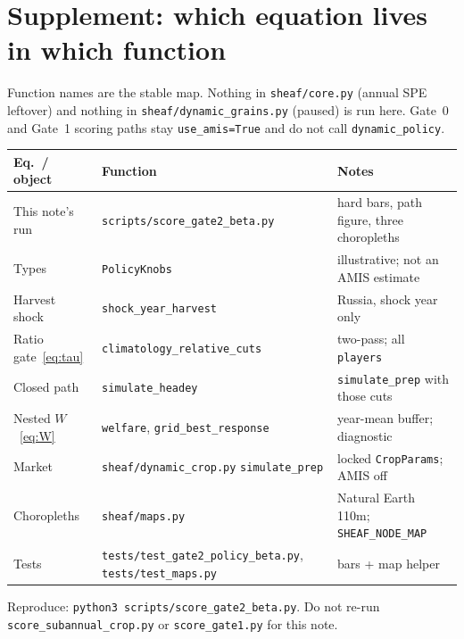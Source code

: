 \section{Supplement: which equation lives in which function}
\label{sec:code}

Function names are the stable map. Nothing in \texttt{sheaf/core.py}
(annual SPE leftover) and nothing in \texttt{sheaf/dynamic\_grains.py}
(paused) is run here. Gate~0 and Gate~1 scoring paths stay
\texttt{use\_amis=True} and do not call \texttt{dynamic\_policy}.

\begin{center}
\small
\begin{tabular}{llp{}}
\toprule
Eq.\ / object & Function & Notes \\
\midrule
This note's run &
\texttt{scripts/score\_gate2\_beta.py} &
hard bars, path figure, three choropleths \\
Types &
\texttt{PolicyKnobs} &
illustrative; not an AMIS estimate \\
Harvest shock &
\texttt{shock\_year\_harvest} &
Russia, shock year only \\
Ratio gate~\eqref{eq:tau} &
\texttt{climatology\_relative\_cuts} &
two-pass; all \texttt{players} \\
Closed path &
\texttt{simulate\_headey} &
\texttt{simulate\_prep} with those cuts \\
Nested \(W\)~\eqref{eq:W} &
\texttt{welfare}, \texttt{grid\_best\_response} &
year-mean buffer; diagnostic \\
Market &
\texttt{sheaf/dynamic\_crop.py}
\texttt{simulate\_prep} &
locked \texttt{CropParams}; AMIS off \\
Choropleths &
\texttt{sheaf/maps.py} &
Natural Earth 110m; \texttt{SHEAF\_NODE\_MAP} \\
Tests &
\texttt{tests/test\_gate2\_policy\_beta.py},
\texttt{tests/test\_maps.py} &
bars + map helper \\
\bottomrule
\end{tabular}
\end{center}

Reproduce: \texttt{python3 scripts/score\_gate2\_beta.py}. Do not re-run
\texttt{score\_subannual\_crop.py} or \texttt{score\_gate1.py} for this note.
